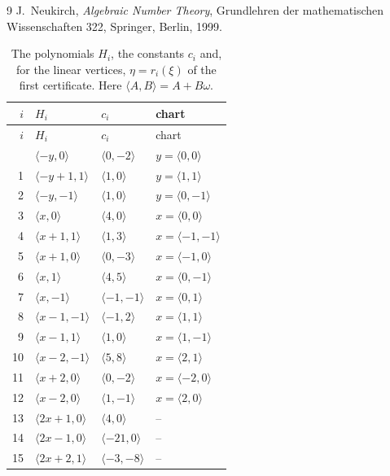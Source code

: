 \documentclass[11pt]{article}
\begin{document}
\begin{thebibliography}{9}
 J.~Neukirch, \emph{Algebraic Number Theory}, Grundlehren der mathematischen Wissenschaften 322, Springer, Berlin, 1999.
\end{thebibliography}

\clearpage
\begingroup\small
\setlength{\LTcapwidth}{\textwidth}
\begin{longtable}{@{}rlll@{}}
\caption{The polynomials $H_i$, the constants $c_i$ and, for the linear vertices, $\eta=r_i(\xi)$ of the first certificate. Here $\langle A,B\rangle=A+B\omega$.}\label{tab:vert1}\\
\hline $i$ & $H_i$ & $c_i$ & chart\\\hline\endfirsthead\hline $i$ & $H_i$ & $c_i$ & chart\\\hline\endhead\hline\endfoot
0 & $\langle -y,0\rangle$ & $\langle 0,-2\rangle$ & $y=\langle 0,0\rangle$\\
1 & $\langle -y+1,1\rangle$ & $\langle 1,0\rangle$ & $y=\langle 1,1\rangle$\\
2 & $\langle -y,-1\rangle$ & $\langle 1,0\rangle$ & $y=\langle 0,-1\rangle$\\
3 & $\langle x,0\rangle$ & $\langle 4,0\rangle$ & $x=\langle 0,0\rangle$\\
4 & $\langle x+1,1\rangle$ & $\langle 1,3\rangle$ & $x=\langle -1,-1\rangle$\\
5 & $\langle x+1,0\rangle$ & $\langle 0,-3\rangle$ & $x=\langle -1,0\rangle$\\
6 & $\langle x,1\rangle$ & $\langle 4,5\rangle$ & $x=\langle 0,-1\rangle$\\
7 & $\langle x,-1\rangle$ & $\langle -1,-1\rangle$ & $x=\langle 0,1\rangle$\\
8 & $\langle x-1,-1\rangle$ & $\langle -1,2\rangle$ & $x=\langle 1,1\rangle$\\
9 & $\langle x-1,1\rangle$ & $\langle 1,0\rangle$ & $x=\langle 1,-1\rangle$\\
10 & $\langle x-2,-1\rangle$ & $\langle 5,8\rangle$ & $x=\langle 2,1\rangle$\\
11 & $\langle x+2,0\rangle$ & $\langle 0,-2\rangle$ & $x=\langle -2,0\rangle$\\
12 & $\langle x-2,0\rangle$ & $\langle 1,-1\rangle$ & $x=\langle 2,0\rangle$\\
13 & $\langle 2x+1,0\rangle$ & $\langle 4,0\rangle$ & --\\
14 & $\langle 2x-1,0\rangle$ & $\langle -21,0\rangle$ & --\\
15 & $\langle 2x+2,1\rangle$ & $\langle -3,-8\rangle$ & --\\

\end{longtable}
\end{document}

